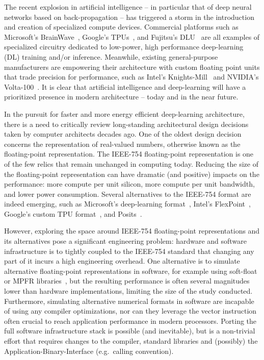 \documentclass[techrep,english]{ipsj} %
\begin{document}
{The recent explosion in artificial intelligence – in particular that of deep neural networks based on back-propagation – has triggered a storm in the introduction and creation of specialized compute devices.
Commercial platforms such as Microsoft’s BrainWave~\cite{msbrainwave}, Google’s TPUs~\cite{googletpu}, and Fujitsu’s DLU~\cite{fujitsudlu} are all examples of specialized circuitry dedicated to low-power, high performance deep-learning (DL) training and/or inference.
Meanwhile, existing general-purpose manufacturers are empowering their architecture with custom floating point units that trade precision for performance, such as Intel’s Knights-Mill~\cite{knm} and NVIDIA’s Volta-100~\cite{volta100}.
It is clear that artificial intelligence and deep-learning will have a prioritized presence in modern architecture -- today and in the near future.

In the pursuit for faster and more energy efficient deep-learning architecture, there is a need to critically review long-standing architectural design decisions taken by computer architects decades ago.
One of the oldest design decision concerns the representation of real-valued numbers, otherwise known as the floating-point representation.
The IEEE-754 floating-point representation is one of the few relics that remain unchanged in computing today.
Reducing the size of the floating-point representation can have dramatic (and positive) impacts on the performance: more compute per unit silicon, more compute per unit bandwidth, and lower power consumption.
Several alternatives to the IEEE-754 format are indeed emerging, such as Microsoft’s deep-learning format~\cite{msbrainwave}, Intel’s FlexPoint~\cite{intelflexpoint}, Google’s custom TPU format~\cite{tpuformat}, and Posits~\cite{posits}.

However, exploring the space around IEEE-754 floating-point representations and its alternatives pose a significant engineering problem: hardware and software infrastructure is to tightly coupled to the IEEE-754 standard that changing any part of it incurs a high engineering overhead.
One alternative is to simulate alternative floating-point representations in software, for example using soft-float or MPFR libraries~\cite{softfloat}, but the resulting performance is often several magnitudes lower than hardware implementations, limiting the size of the study conducted.
Furthermore, simulating alternative numerical formats in software are incapable of using any compiler optimizations, nor can they leverage the vector instruction often crucial to reach application performance in modern processors.
Porting the full software infrastructure stack is possible (and inevitable), but is a non-trivial effort that requires changes to the compiler, standard libraries and (possibly) the Application-Binary-Interface (e.g.\ calling convention).

}
\end{document}
